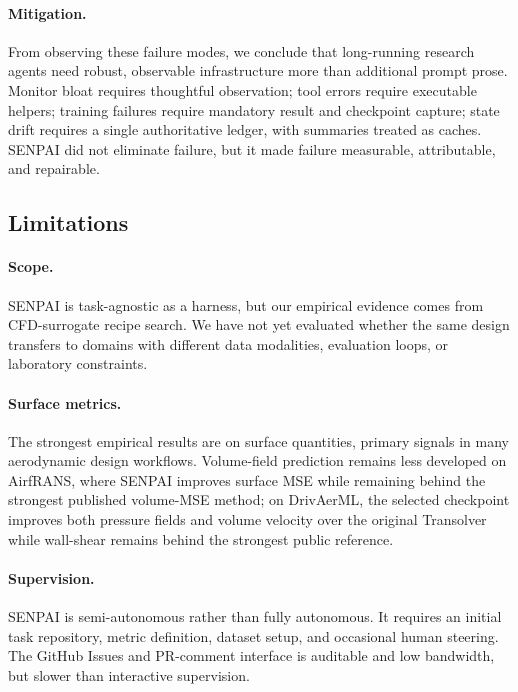 \documentclass{article}
\begin{document}
\paragraph{Mitigation.}
From observing these failure modes, we conclude that long-running research agents need robust, observable infrastructure more than additional prompt prose. Monitor bloat requires thoughtful observation; tool errors require executable helpers; training failures require mandatory result and checkpoint capture; state drift requires a single authoritative ledger, with summaries treated as caches. SENPAI did not eliminate failure, but it made failure measurable, attributable, and repairable.

\subsection{Limitations}

\paragraph{Scope.}
SENPAI is task-agnostic as a harness, but our empirical evidence comes from CFD-surrogate recipe search. We have not yet evaluated whether the same design transfers to domains with different data modalities, evaluation loops, or laboratory constraints.

\paragraph{Surface metrics.}
The strongest empirical results are on surface quantities, primary signals in many aerodynamic design workflows. Volume-field prediction remains less developed on AirfRANS, where SENPAI improves surface MSE while remaining behind the strongest published volume-MSE method; on DrivAerML, the selected checkpoint improves both pressure fields and volume velocity over the original Transolver while wall-shear remains behind the strongest public reference.

\paragraph{Supervision.}
SENPAI is semi-autonomous rather than fully autonomous. It requires an initial task repository, metric definition, dataset setup, and occasional human steering. The GitHub Issues and PR-comment interface is auditable and low bandwidth, but slower than interactive supervision.
\end{document}
